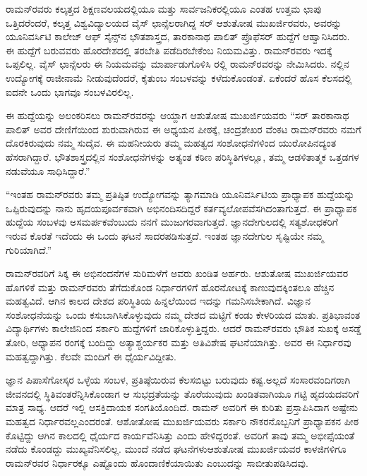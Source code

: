 ರಾಮನ್‍ರವರು ಕಲ್ಕತ್ತದ ಶಿಕ್ಷಣವಲಯದಲ್ಲಿಯೂ ಮತ್ತು ಸಾರ್ವಜನಿಕರಲ್ಲಿಯೂ ಎಂತಹ ಉತ್ತಮ ಛಾಪು ಒತ್ತಿದರೆಂದರೆ, ಕಲ್ಕತ್ತ ವಿಶ್ವವಿದ್ಯಾಲಯದ ವೈಸ್ ಛಾನ್ಸೆಲರಾಗಿದ್ದ ಸರ್ ಆಶುತೋಷ ಮುಖರ್ಜಿರವರು, ಅವರನ್ನು ಯೂನಿವರ್ಸಿಟಿ ಕಾಲೇಜ್ ಆಫ್ ಸೈನ್ಸ್‌ನ ಭೌತಶಾಸ್ತ್ರದ, ತಾರಕಾನಾಥ ಪಾಲಿತ್ ಪ್ರೊಫೆಸರ್ ಹುದ್ದೆಗೆ ಆಹ್ವಾನಿಸಿದರು. ಈ ಹುದ್ದೆಗೆ ಬರುವವರು ಹೊರದೇಶದಲ್ಲಿ ತರಬೇತಿ ಪಡೆದಿರಬೇಕೆಂಬ ನಿಯಮವಿತ್ತು. ರಾಮನ್‍ರವರು ಇದಕ್ಕೆ ಒಪ್ಪಲಿಲ್ಲ. ವೈಸ್ ಛಾನ್ಸೆಲರು ಈ ನಿಯಮವನ್ನು ಮಾರ್ಪಾಡುಗೊಳಿಸಿ ರಲ್ಲಿ ರಾಮನ್‍ರವರನ್ನು ನೇಮಿಸಿದರು.  ನಲ್ಲಿನ ಉದ್ಯೋಗಕ್ಕೆ ರಾಜೀನಾಮೆ ನೀಡುವುದೆಂದರೆ, ಕೈತುಂಬ ಸಂಬಳವನ್ನು ಕಳೆದುಕೊಂಡಂತೆ. ಏಕೆಂದರೆ ಹೊಸ ಕೆಲಸದಲ್ಲಿ ಐದನೇ ಒಂದು ಭಾಗವೂ ಸಂಬಳವಿರಲಿಲ್ಲ.

ಈ ಹುದ್ದೆಯನ್ನು ಅಲಂಕರಿಸಲು ರಾಮನ್‍ರವರನ್ನು ಆಯ್ದಾಗ ಆಶುತೋಷ ಮುಖರ್ಜಿಯವರು \enginline{-} “ಸರ್ ತಾರಕಾನಾಥ ಪಾಲಿತ್ ಅವರ ದೇಣಿಗೆಯಿಂದ ಶುರುವಾಗಿರುವ ಈ ಅಧ್ಯಯನ ಪೀಠಕ್ಕೆ, ಚಂದ್ರಶೇಖರ ವೆಂಕಟ ರಾಮನ್‍ರವರು ನಮಗೆ ದೊರಕಿರುವುದು ನಮ್ಮ ಸುದೈವ. ಈ ಮಹನೀಯರು ತಮ್ಮ ಮಹತ್ವದ ಸಂಶೋಧನೆಗಳಿಂದ ಯುರೋಪಿನದ್ಯಂತ ಹೆಸರಾಗಿದ್ದಾರೆ. ಭೌತಶಾಸ್ತ್ರದಲ್ಲಿನ ಸಂಶೋಧನೆಗಳನ್ನು ಅತ್ಯಂತ ಕಠಿಣ ಪರಿಸ್ಥಿತಿಗಳಲ್ಲೂ, ತಮ್ಮ ಆಡಳಿತಾತ್ಮಕ ಒತ್ತಡಗಳ ನಡುವೆಯೂ ಸಾಧಿಸಿದ್ದಾರೆ.”

“ಇಂತಹ ರಾಮನ್‍ರವರು ತಮ್ಮ ಪ್ರತಿಷ್ಠಿತ ಉದ್ಯೋಗವನ್ನು ತ್ಯಾಗಮಾಡಿ ಯೂನಿವರ್ಸಿಟಿಯ ಪ್ರಾಧ್ಯಾಪಕ ಹುದ್ದೆಯನ್ನು ಒಪ್ಪಿರುವುದನ್ನು ನಾನು ಹೃದಯಪೂರ್ವಕವಾಗಿ ಅಭಿನಂದಿಸದಿದ್ದರೆ ಕರ್ತವ್ಯಲೋಪವೆಸಗಿದಂತಾಗುತ್ತದೆ. ಈ ಪ್ರಾಧ್ಯಾಪಕ ಹುದ್ದೆಯ ಸಂಬಳವು ಅಸಮರ್ಪಕವೆಂಬುದು ನನಗೆ ಮುಜುಗರವಾಗುತ್ತದೆ. ಜ್ಞಾನದೇಗುಲದಲ್ಲಿ ಸತ್ಯಶೋಧಕರಿಗೆ ಇರುವ ಕೊರತೆ ಇದೆಂದು ಈ ಒಂದು ಘಟನೆ ಸಾದರಪಡಿಸುತ್ತದೆ. ಇಂತಹ ಜ್ಞಾನದೇಗುಲ ಸೃಷ್ಟಿಯೇ ನಮ್ಮ ಗುರಿಯಾಗಿದೆ.”

ರಾಮನ್‍ರವರಿಗೆ ಸಿಕ್ಕ ಈ ಅಭಿನಂದನೆಗಳ ಸುರಿಮಳೆಗೆ ಅವರು ಖಂಡಿತ ಅರ್ಹರು. ಆಶುತೋಷ ಮುಖರ್ಜಿಯವರ ಹೊಗಳಿಕೆ ಮತ್ತು ರಾಮನ್‍ರವರು ತೆಗೆದುಕೊಂಡ ನಿರ್ಧಾರಗಳಿಗೆ ಹೊರನೋಟಕ್ಕೆ ಕಾಣುವುದಕ್ಕಿಂತಲೂ ಹೆಚ್ಚಿನ ಮಹತ್ವವಿದೆ. ಆಗಿನ ಕಾಲದ ದೇಶದ ಪರಿಸ್ಥಿತಿಯ ಹಿನ್ನಲೆಯಿಂದ ಇದನ್ನು ಗಮನಿಸಬೇಕಾಗಿದೆ. ವಿಜ್ಞಾನ ಸಂಶೋಧನೆಯನ್ನು ಒಂದು ಕಸುಬಾಗಿಸಿಕೊಳ್ಳುವುದು ನಮ್ಮ ದೇಶದ ಮಟ್ಟಿಗೆ ಕಂಡು ಕೇಳರಿಯದ ಮಾತು. ಪ್ರತಿಭಾವಂತ ವಿದ್ಯಾರ್ಥಿಗಳು ಕಾಲೇಜಿನಿಂದ ಸರ್ಕಾರಿ ಹುದ್ದೆಗಳಿಗೆ ಜಾರಿಕೊಳ್ಳುತ್ತಿದ್ದರು. ಆದರೆ ರಾಮನ್‍ರವರು ಭೌತಿಕ ಸುಖಕ್ಕೆ ಅಸಡ್ಡೆ ತೋರಿ, ಅಧ್ಯಾಪನ ರಂಗಕ್ಕೆ ಬಂದಿದ್ದು ಅತ್ಯಾಶ್ಚರ್ಯಕರ ಮತ್ತು ಅತಿವಿಶೇಷ ಘಟನೆಯಾಗಿತ್ತು. ಅವರ ಈ ನಿರ್ಧಾರವು ಮಹತ್ವದ್ದಾಗಿತ್ತು. ಕೆಲವೇ ಮಂದಿಗೆ ಈ ಧೈರ್ಯವಿದ್ದೀತು.

ಜ್ಞಾನ ಪಿಪಾಸೆಗೋಸ್ಕರ ಒಳ್ಳೆಯ ಸಂಬಳ, ಪ್ರತಿಷ್ಠೆಯಿರುವ ಕೆಲಸಬಿಟ್ಟು ಬರುವುದು ಕಷ್ಟ.\break ಅಲ್ಲದೆ ಸಂಸಾರವಂದಿಗರಾಗಿ ಜೀವನದಲ್ಲಿ ಸ್ಥಿತಿವಂತರೆನ್ನಿಸಿಕೊಂಡಾಗ ಆ ಸುಭದ್ರತೆಯನ್ನು ತೊರೆಯುವುದು ಖಂಡಿತವಾಗಿಯೂ ಗಟ್ಟಿ ಹೃದಯದವರಿಗೆ ಮಾತ್ರ ಸಾಧ್ಯ. ಆದರೆ ಇಲ್ಲಿ ಆಸಕ್ತಿದಾಯಕ ಸಂಗತಿಯೊಂದಿದೆ. ರಾಮನ್ ಅವರಿಗೆ ಈ ಕುರಿತು ಪ್ರಸ್ತಾಪಿಸಿದಾಗ ಅಷ್ಟೇನು ಮಹತ್ವದ ನಿರ್ಧಾರವಲ್ಲ\break ಎಂದರಂತೆ. ಆಶೋತೋಷ ಮುಖರ್ಜಿಯವರು ಸರ್ಕಾರಿ ನೌಕರನೊಬ್ಬನಿಗೆ ಪ್ರಾಧ್ಯಾಪಕನ ಪೀಠ ಕೊಟ್ಟಿದ್ದು ಆಗಿನ ಕಾಲದಲ್ಲಿ ಧೈರ್ಯದ ಕಾರ್ಯವೆನಿಸಿತ್ತು ಎಂದು ಹೇಳಿದ್ದರಂತೆ. ಅವರಿಗೆ ತಾವು ತಮ್ಮ ಅಭೀಪ್ಸೆಯಂತೆ ನಡೆದು ಕೊಂಡದ್ದು ಮುಖ್ಯವೆನಿಸಲಿಲ್ಲ. ಮುಂದೆ ನಡೆದ ಘಟನೆಗಳು\break ಆಶುತೋಷ ಮುಖರ್ಜಿಯವರ ಕಾಳಜಿಗಳಿಗೂ ರಾಮನ್‍ರವರ ನಿರ್ಧಾರಕ್ಕೂ ಎಷ್ಟೊಂದು ಹೊಂದಾ\-ಣಿಕೆಯಾಯಿತು ಎಂಬುದನ್ನು ಸಾಬೀತುಪಡಿಸಿದವು.

